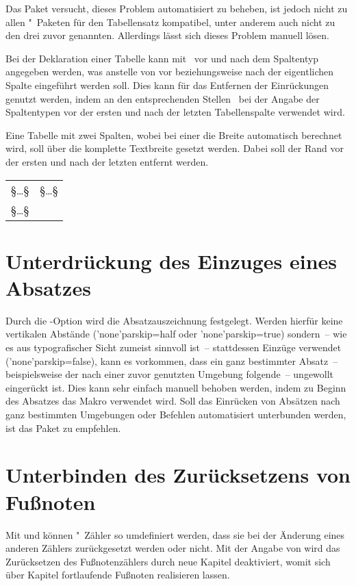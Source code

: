 Das Paket  versucht, dieses Problem automatisiert zu 
beheben, ist jedoch nicht zu allen "~Paketen für den 
Tabellensatz kompatibel, unter anderem auch nicht zu den drei zuvor genannten. 
Allerdings lässt sich dieses Problem manuell lösen. 

Bei der Deklaration einer Tabelle kann mit~\MPValue{\dots} vor und 
nach dem Spaltentyp angegeben werden, was anstelle von  vor 
beziehungsweise nach der eigentlichen Spalte eingeführt werden soll. Dies kann 
für das Entfernen der Einrückungen genutzt werden, indem an den entsprechenden 
Stellen~ bei der Angabe der Spaltentypen vor der ersten und 
nach der letzten Tabellenspalte verwendet wird.
%
\begin{Example}
Eine Tabelle mit zwei Spalten, wobei bei einer die Breite automatisch berechnet 
wird, soll über die komplette Textbreite gesetzt werden. Dabei soll der Rand 
vor der ersten und nach der letzten entfernt werden.
\begin{Code}[escapechar=§]
\begin{tabularx}{\textwidth}{@{}lX@{}}
§\dots§ & §\dots§ \tabularnewline
§\dots§
\end{tabularx}
\end{Code}
\end{Example}



\section{%
  Unterdrückung des Einzuges eines Absatzes%
}
%
Durch die \KOMAScript-Option  wird
die Absatzauszeichnung  festgelegt. Werden hierfür keine vertikalen Abstände 
(\Option'none'{parskip=half} oder \Option'none'{parskip=true}) sondern~-- wie 
es aus typografischer Sicht zumeist sinnvoll ist~-- stattdessen Einzüge 
verwendet (\Option'none'{parskip=false}), kann es vorkommen, dass ein ganz 
bestimmter Absatz~-- beispielsweise der nach einer zuvor genutzten Umgebung 
folgende~-- ungewollt eingerückt ist. Dies kann sehr einfach manuell behoben 
werden, indem zu Beginn des Absatzes das Makro  verwendet wird. 
Soll das Einrücken von Absätzen nach ganz bestimmten Umgebungen oder Befehlen 
automatisiert unterbunden werden, ist das Paket  zu 
empfehlen.



\section{%
  Unterbinden des Zurücksetzens von Fußnoten%
  \label{sec:tips:counter}%
}
%
Mit  und  können 
"~Zähler so umdefiniert werden, dass sie bei der Änderung eines 
anderen Zählers zurückgesetzt werden oder nicht. Mit der Angabe von 
 wird das 
Zurücksetzen des Fußnotenzählers durch neue Kapitel deaktiviert, womit sich 
über Kapitel fortlaufende Fußnoten realisieren lassen.



